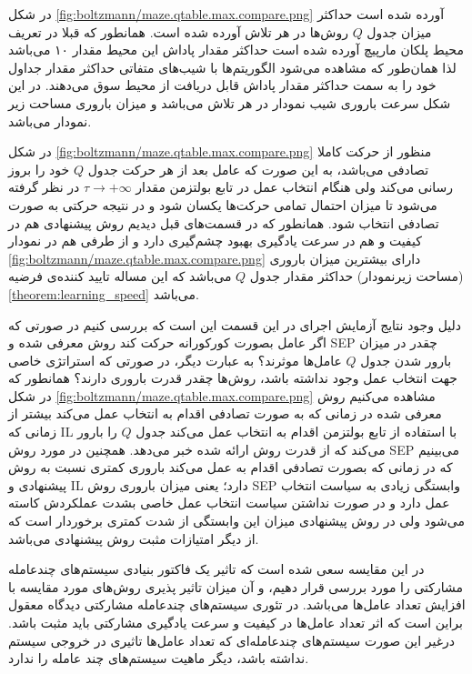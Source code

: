 در شکل
\ref{fig:boltzmann/maze.qtable.max.compare.png}
آورده شده است حداکثر میزان جدول $Q$ روش‌ها در هر تلاش آورده شده است. همانطور که قبلا در تعریف محیط پلکان مارپیچ آورده شده است حداکثر مقدار پاداش این محیط مقدار ۱۰ می‌باشد لذا همان‌طور که مشاهده می‌شود الگوریتم‌ها با شیب‌های متفاتی حداکثر مقدار جداول خود را به سمت حداکثر مقدار پاداش قابل دریافت از محیط سوق می‌دهند. در این شکل سرعت باروری شیب نمودار در هر تلاش می‌باشد و میزان باروری مساحت زیر نمودار می‌باشد.


در شکل
\ref{fig:boltzmann/maze.qtable.max.compare.png}
منظور از  حرکت کاملا تصادفی می‌باشد، به این صورت که عامل بعد از هر حرکت جدول $Q$ خود را بروز رسانی می‌کند ولی هنگام انتخاب عمل در تابع بولتزمن مقدار $\tau \rightarrow +\infty$ در نظر گرفته می‌شود تا میزان احتمال تمامی حرکت‌ها یکسان شود و در نتیجه حرکتی به صورت تصادفی انتخاب شود. همانطور که در قسمت‌های قبل دیدیم روش پیشنهادی هم در کیفیت و هم در سرعت یادگیری بهبود چشم‌گیری دارد و از طرفی هم در نمودار
\ref{fig:boltzmann/maze.qtable.max.compare.png}
دارای بیشترین میزان باروری (مساحت زیرنمودار) حداکثر مقدار جدول $Q$ می‌باشد که این مساله تایید کننده‌ی فرضیه
\ref{theorem:learning_speed}
می‌باشد.

دلیل وجود نتایج آزمایش‌ اجرای  در این قسمت این است که بررسی کنیم در صورتی که اگر عامل بصورت کورکورانه حرکت کند روش‌ معرفی شده و SEP چقدر در میزان بارور شدن جدول $Q$ عامل‌ها موثرند؟ به عبارت دیگر، در صورتی که استراتژی خاصی جهت انتخاب عمل وجود نداشته باشد، روش‌ها چقدر قدرت باروری دارند؟ همانطور که در شکل
\ref{fig:boltzmann/maze.qtable.max.compare.png}
مشاهده می‌کنیم روش معرفی شده در زمانی که به صورت تصادفی اقدام به انتخاب عمل می‌کند بیشتر از زمانی که IL با استفاده از تابع بولتزمن اقدام به انتخاب عمل می‌کند جدول $Q$ را بارور می‌کند که از قدرت روش ارائه شده خبر می‌دهد. همچنین در مورد روش SEP می‌بینیم که در زمانی که بصورت تصادفی اقدام به عمل می‌کند باروری کمتری نسبت به روش پیشنهادی و IL دارد؛ یعنی میزان باروری روش SEP وابستگی زیادی به سیاست انتخاب عمل دارد و در صورت نداشتن سیاست انتخاب عمل خاصی بشدت عملکردش کاسته می‌شود ولی در روش پیشنهادی میزان این وابستگی از شدت کمتری برخوردار است که از دیگر امتیازات مثبت روش پیشنهادی می‌باشد.

 در این مقایسه سعی شده است که تاثیر یک فاکتور بنیادی سیستم‌های چندعامله مشارکتی را مورد بررسی قرار دهیم، و آن میزان تاثیر پذیری روش‌های مورد مقایسه با افزایش تعداد عامل‌ها می‌باشد. در تئوری سیستم‌های چندعامله مشارکتی دیدگاه معقول براین است که اثر تعداد عامل‌ها در کیفیت و سرعت یادگیری مشارکتی باید مثبت باشد. درغیر این صورت سیستم‌های چندعامله‌ای که تعداد عامل‌ها تاثیری در خروجی سیستم نداشته باشد، دیگر ماهیت سیستم‌های چند عامله را ندارد.

